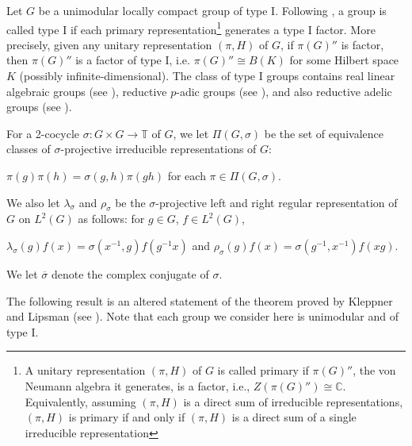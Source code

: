 \documentclass[11pt]{article}
\theoremstyle{plain}
\theoremstyle{remark}
\theoremstyle{definition}
\begin{document}
Let $G$ be a unimodular locally compact group of type I. 
Following \cite[\S 7.2]{Fo2}, a group is called type I if each primary representation\footnote{A unitary representation $(\pi,H)$ of $G$ is called primary if $\pi(G)''$, the von Neumann algebra it generates, is a factor, i.e., $Z(\pi(G)'')\cong \mathbb{C}$. 
Equivalently, assuming $(\pi,H)$ is a direct sum of irreducible representations, $(\pi,H)$ is primary if and only if $(\pi,H)$ is a direct sum of a single irreducible representation}  
 generates a type I factor. 
More precisely, given any unitary representation $(\pi,H)$ of $G$, if $\pi(G)''$ is factor, then $\pi(G)''$ is a factor of type I, i.e. $\pi(G)''\cong B(K)$ for some Hilbert space $K$ (possibly infinite-dimensional).
The class of type I groups contains real linear algebraic groups (see \cite[\S 8.4]{Kiri76}), 
reductive $p$-adic groups (see \cite{Bnst74}), and
also reductive adelic groups (see \cite[Appendix]{Clz07}). 


 
For a 2-cocycle $\sigma\colon G\times G\to \mathbb{T}$ of $G$, we let
$\Pi(G,\sigma)$ be the set of equivalence classes of $\sigma$-projective irreducible representations of $G$:
\begin{center}
    $\pi(g)\pi(h)=\sigma(g,h)\pi(gh)$ for each $\pi \in \Pi(G,\sigma)$. 
\end{center} 
We also let $\lambda_{\sigma}$ and $\rho_{\sigma}$ be the $\sigma$-projective left and right regular representation of $G$ on $L^2(G)$ as follows: 
for $g\in G$, $f\in L^2(G)$, 
\begin{center}
    $\lambda_{\sigma}(g)f(x)=\sigma(x^{-1},g)f(g^{-1}x)$ and $\rho_{\sigma}(g)f(x)=\sigma(g^{-1},x^{-1})f(xg)$. 
\end{center}
We let $\overline{\sigma}$ denote the complex conjugate of $\sigma$. 

The following result is an altered statement of the theorem proved by Kleppner and Lipsman (see \cite[I.Theorem 7.1]{KlepLips1972}). 
Note that each group we consider here is unimodular and of type I. 
\end{document}
